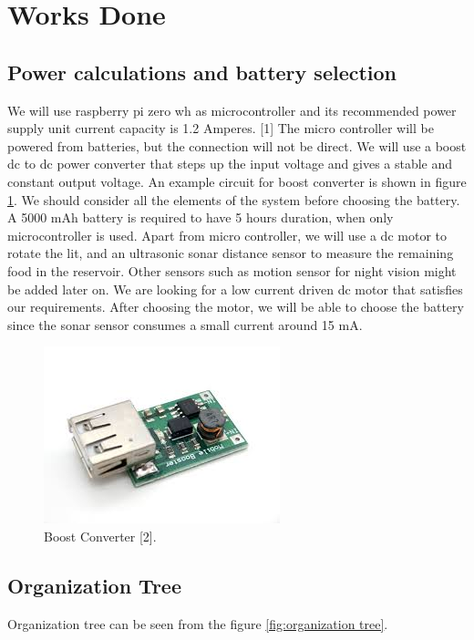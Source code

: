 \section{Works Done}
\label{sec:worksDone}
\subsection{Power calculations and battery selection}


We will use raspberry pi zero wh as microcontroller and its recommended power supply unit current capacity is 1.2 Amperes. [1] The micro controller will be powered from batteries, but the connection will not be direct. We will use a boost dc to dc power converter that steps up the input voltage and gives a stable and constant output voltage. An example circuit for boost converter is shown in figure \ref{fig:boostconverter}. We should consider all the elements of the system before choosing the battery. A 5000 mAh battery is required to have 5 hours duration, when only microcontroller is used.  Apart from micro controller,  we will use a dc motor to rotate the lit, and an ultrasonic sonar distance sensor to measure the remaining food in the reservoir. Other sensors such as motion sensor for night vision might be added later on. We are looking for a low current driven dc motor that satisfies our requirements. After choosing the motor, we will be able to choose the battery since the sonar sensor consumes a small current around 15 mA.

\begin{figure} [h]
     \centering
     \includegraphics{boostconverter.jpeg}
     \caption{Boost Converter [2].}
     \label{fig:boostconverter}
\end{figure}

\subsection{Organization Tree}

Organization tree can be seen from the figure \ref{fig:organization tree}.

